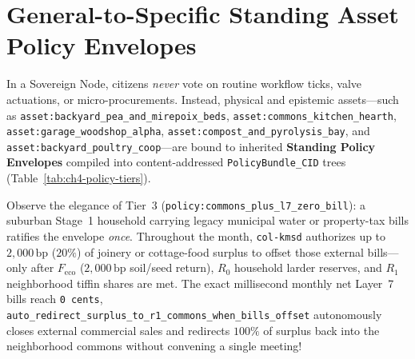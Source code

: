 \section{General-to-Specific Standing Asset Policy Envelopes}
\label{sec:ch4-standing-envelopes}

In a Sovereign Node, citizens \textit{never} vote on routine workflow ticks, valve actuations, or
micro-procurements. Instead, physical and epistemic assets---such as
\texttt{asset:backyard\_pea\_and\_mirepoix\_beds}, \texttt{asset:commons\_kitchen\_hearth},
\texttt{asset:garage\_woodshop\_alpha}, \texttt{asset:compost\_and\_pyrolysis\_bay}, and
\texttt{asset:backyard\_poultry\_coop}---are bound to inherited \textbf{Standing Policy Envelopes}
compiled into content-addressed \texttt{PolicyBundle\_CID} trees
(Table~\ref{tab:ch4-policy-tiers}).

\begin{table}[htbp]
\centering
\caption{Three-Tier Inherited Standing Asset Policy Templates in \texttt{polycentric\_asset\_policies.json}}
\label{tab:ch4-policy-tiers}
\footnotesize
{}
\end{table}

Observe the elegance of Tier~3 (\texttt{policy:commons\_plus\_l7\_zero\_bill}): a suburban
Stage~1 household carrying legacy municipal water or property-tax bills ratifies the envelope
\textit{once}. Throughout the month, \texttt{col-kmsd} authorizes up to $2{,}000\,\mathrm{bp}$
($20\%$) of joinery or cottage-food surplus to offset those external bills—only after
$F_{\mathrm{eco}}$ ($2{,}000\,\mathrm{bp}$ soil/seed return), $R_0$ household larder reserves,
and $R_1$ neighborhood tiffin shares are met. The exact millisecond monthly net Layer~7 bills
reach \texttt{0 cents}, \texttt{auto\_redirect\_surplus\_to\_r1\_commons\_when\_bills\_offset}
autonomously closes external commercial sales and redirects $100\%$ of surplus back into the
neighborhood commons without convening a single meeting!

